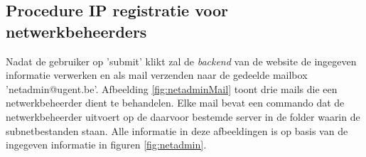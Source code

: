\clearpage
{}


\subsection{Procedure IP registratie voor netwerkbeheerders}
Nadat de gebruiker op 'submit' klikt zal de \textit{backend} van de website de ingegeven informatie verwerken en als mail verzenden naar de gedeelde mailbox 'netadmin@ugent.be'. Afbeelding \ref{fig:netadminMail} toont drie mails die een netwerkbeheerder dient te behandelen. Elke mail bevat een commando dat de netwerkbeheerder uitvoert op de daarvoor bestemde server in de folder waarin de subnetbestanden staan. Alle informatie in deze afbeeldingen is op basis van de ingegeven informatie in figuren \ref{fig:netadmin}.

